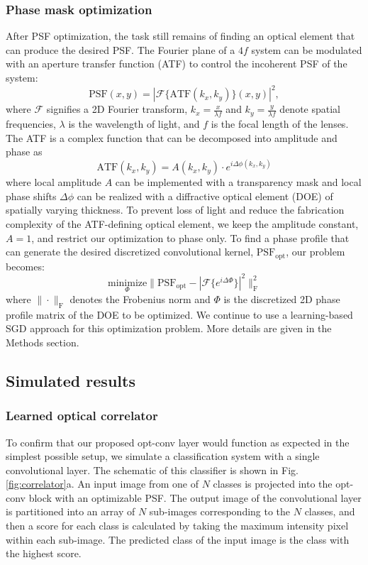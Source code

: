 \documentclass[fleqn,10pt]{wlscirep}
\begin{document}
\subsubsection*{Phase mask optimization} After PSF optimization, the task still remains of finding an optical element that can produce the desired PSF. The Fourier plane of a $4f$ system can be modulated with an aperture transfer function (ATF) to control the incoherent PSF of the system:
\begin{equation} \text{PSF}(x,y) = |\mathcal{F}\{\text{ATF}(k_x, k_y)\}(x,y)|^2,\end{equation}
where $\mathcal{F}$ signifies a 2D Fourier transform, $ k_x = \frac{x}{\lambda f}$ and $k_y = \frac{y}{\lambda f}$ denote spatial frequencies, $\lambda$ is the wavelength of light, and $f$ is the focal length of the lenses. The ATF is a complex function that can be decomposed into amplitude and phase as
\begin{equation} 
\text{ATF}(k_x, k_y) = A(k_x, k_y)\cdot e^{i\Delta \phi (k_x, k_y)}
\end{equation}
where local amplitude $A$ can be implemented with a transparency mask and local phase shifts $\Delta \phi$ can be realized with a diffractive optical element (DOE) of spatially varying thickness. To
prevent loss of light and reduce the fabrication complexity of the ATF-defining optical element, we keep the amplitude constant, $A = 1$, and restrict our optimization to phase only. To find a phase profile that can generate the desired discretized convolutional kernel, $\text{PSF}_\text{opt}$, our problem becomes:
\begin{equation} \underset{\Phi}{\text{minimize}} \|\text{PSF}_\text{opt} - |\mathcal{F}\{e^{i\Delta \Phi}\}|^2\|^2_\text{F}
\end{equation}
where $\|\cdot\|_\text{F}$ denotes the Frobenius norm and $\Phi$ is the discretized 2D phase profile matrix of the DOE to be optimized. We continue to use a learning-based SGD approach for this optimization problem. More details are given in the Methods section.


\subsection*{Simulated results}

\subsubsection*{Learned optical correlator} 
To confirm that our proposed opt-conv layer would function as expected in the simplest possible setup, we simulate a classification system with a single convolutional layer. The schematic of this classifier is shown in Fig. \ref{fig:correlator}a. An input image from one of $N$ classes is projected into the opt-conv block with an optimizable PSF. The output image of the convolutional layer is partitioned into an array of $N$ sub-images corresponding to the $N$ classes, and then a score for each class is calculated by taking the maximum intensity pixel within each sub-image. The predicted class of the input image is the class with the highest score.
\end{document}
